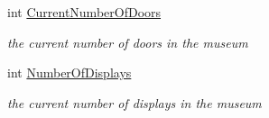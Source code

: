 \begin{DoxyCompactItemize}
int \mbox{\hyperlink{class_museum_ab814feb2d391ec372dfc3a6c6c61c51f}{Current\+Number\+Of\+Doors}}
\begin{DoxyCompactList}\small\item\em the current number of doors in the museum \end{DoxyCompactList}\item 
int \mbox{\hyperlink{class_museum_ac6942612f3be979812b450ee9140caf1}{Number\+Of\+Displays}}
\begin{DoxyCompactList}\small\item\em the current number of displays in the museum \end{DoxyCompactList}\end{DoxyCompactItemize}
